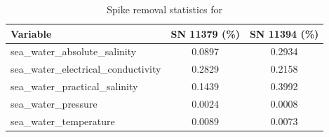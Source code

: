 \begin{table}[h]
\centering
\caption{Spike removal statistics for \projectname{} \casenumber{}}
\label{tab:str19_spike_stats}
\begin{tabular}{|l|c|c|}
\hline
Variable & SN 11379 (\%) & SN 11394 (\%) \\
\hline
sea\_water\_absolute\_salinity & 0.0897 & 0.2934 \\
sea\_water\_electrical\_conductivity & 0.2829 & 0.2158 \\
sea\_water\_practical\_salinity & 0.1439 & 0.3992 \\
sea\_water\_pressure & 0.0024 & 0.0008 \\
sea\_water\_temperature & 0.0089 & 0.0073 \\
\hline
\end{tabular}
\end{table}
